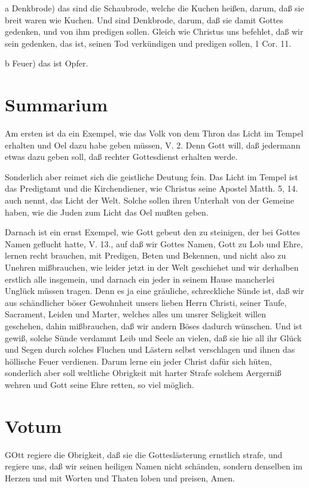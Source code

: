 a Denkbrode) das sind die Schaubrode, welche die Kuchen heißen, darum, daß sie breit waren wie Kuchen. Und sind Denkbrode, darum, daß sie damit Gottes gedenken, und von ihm predigen sollen. Gleich wie Christus uns befehlet, daß wir sein gedenken, das ist, seinen Tod verkündigen und predigen sollen, 1 Cor. 11.

b Feuer) das ist Opfer.

\section{Summarium}

Am ersten ist da ein Exempel, wie das Volk von dem Thron das Licht im Tempel erhalten und Oel dazu habe geben müssen, V. 2. Denn Gott will, daß jedermann etwas dazu geben soll, daß rechter Gottesdienst erhalten werde.

Sonderlich aber reimet sich die geistliche Deutung fein. Das Licht im Tempel ist das Predigtamt und die Kirchendiener, wie Christus seine Apostel Matth. 5, 14. auch nennt, das Licht der Welt. Solche sollen ihren Unterhalt von der Gemeine haben, wie die Juden zum Licht das Oel mußten geben.

Darnach ist ein ernst Exempel, wie Gott gebeut den zu steinigen, der bei Gottes Namen geflucht hatte, V. 13., auf daß wir Gottes Namen, Gott zu Lob und Ehre, lernen recht brauchen, mit Predigen, Beten und Bekennen, und nicht also zu Unehren mißbrauchen, wie leider jetzt in der Welt geschiehet und wir derhalben erstlich alle insgemein, und darnach ein jeder in seinem Hause mancherlei Unglück müssen tragen. Denn es ja eine gräuliche, schreckliche Sünde ist, daß wir aus schändlicher böser Gewohnheit unsers lieben Herrn Christi, seiner Taufe, Sacrament, Leiden und Marter, welches alles um unsrer Seligkeit willen geschehen, dahin mißbrauchen, daß wir andern Böses dadurch wünschen. Und ist gewiß, solche Sünde verdammt Leib und Seele an vielen, daß sie hie all ihr Glück und Segen durch solches Fluchen und Lästern selbst verschlagen und ihnen das höllische Feuer verdienen. Darum lerne ein jeder Christ dafür sich hüten, sonderlich aber soll weltliche Obrigkeit mit harter Strafe solchem Aergerniß wehren und Gott seine Ehre retten, so viel möglich.

\section{Votum}

GOtt regiere die Obrigkeit, daß sie die Gotteslästerung ernstlich strafe, und regiere uns, daß wir seinen heiligen Namen nicht schänden, sondern denselben im Herzen und mit Worten und Thaten loben und preisen, Amen.

